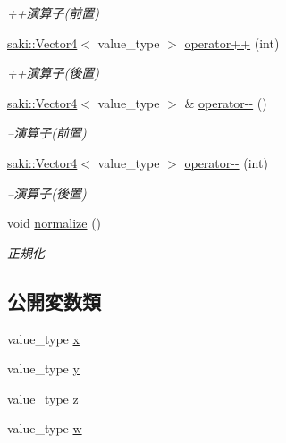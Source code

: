 \begin{DoxyCompactItemize}
\begin{DoxyCompactList}\small\item\em ++演算子(前置) \end{DoxyCompactList}\item 
\mbox{\hyperlink{classsaki_1_1_vector4}{saki\+::\+Vector4}}$<$ value\+\_\+type $>$ \mbox{\hyperlink{classsaki_1_1_vector4_a3392e217f2c88b59a6b1909af8d225d6}{operator++}} (int)
\begin{DoxyCompactList}\small\item\em ++演算子(後置) \end{DoxyCompactList}\item 
\mbox{\hyperlink{classsaki_1_1_vector4}{saki\+::\+Vector4}}$<$ value\+\_\+type $>$ \& \mbox{\hyperlink{classsaki_1_1_vector4_af1ad8ad75a0123a8c54c909c91c866cd}{operator-\/-\/}} ()
\begin{DoxyCompactList}\small\item\em --演算子(前置) \end{DoxyCompactList}\item 
\mbox{\hyperlink{classsaki_1_1_vector4}{saki\+::\+Vector4}}$<$ value\+\_\+type $>$ \mbox{\hyperlink{classsaki_1_1_vector4_ad1c11380a18df412290242271587c1fa}{operator-\/-\/}} (int)
\begin{DoxyCompactList}\small\item\em --演算子(後置) \end{DoxyCompactList}\item 
void \mbox{\hyperlink{classsaki_1_1_vector4_a0dffdb9814b980692e096cfca3438665}{normalize}} ()
\begin{DoxyCompactList}\small\item\em 正規化 \end{DoxyCompactList}\end{DoxyCompactItemize}
\subsection*{公開変数類}
\begin{DoxyCompactItemize}
\item 
value\+\_\+type \mbox{\hyperlink{classsaki_1_1_vector4_a07c6a4beecbc0baa5ca27be031290c04}{x}}
\item 
value\+\_\+type \mbox{\hyperlink{classsaki_1_1_vector4_ad0b51a883b9d9e620598f3c2396db62f}{y}}
\item 
value\+\_\+type \mbox{\hyperlink{classsaki_1_1_vector4_a0d2525927f1a8c931b7596e258da1e9a}{z}}
\item 
value\+\_\+type \mbox{\hyperlink{classsaki_1_1_vector4_a871d2c114623ae8a76fdfaa61733aebb}{w}}
\end{DoxyCompactItemize}



